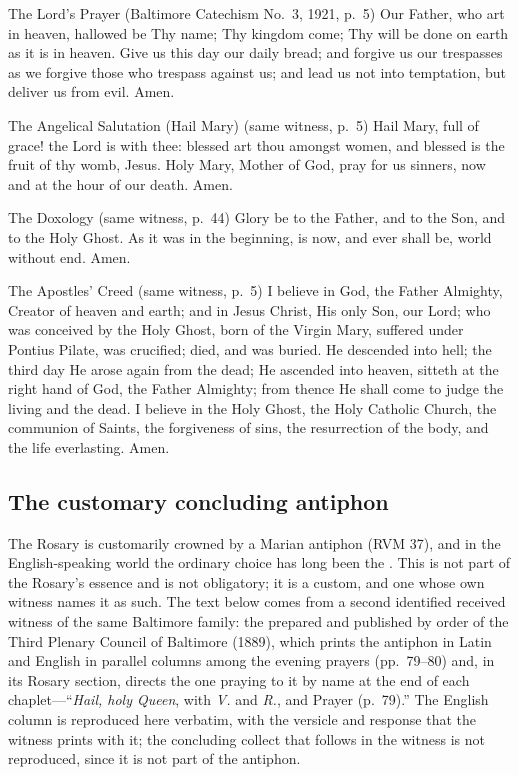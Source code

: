 \begin{receivedtext}{The Lord's Prayer (Baltimore Catechism No.~3, 1921, p.~5)}
Our Father, who art in heaven, hallowed be Thy name; Thy kingdom come;
Thy will be done on earth as it is in heaven. Give us this day our
daily bread; and forgive us our trespasses as we forgive those who
trespass against us; and lead us not into temptation, but deliver us
from evil. Amen.
\end{receivedtext}

\begin{receivedtext}{The Angelical Salutation (Hail Mary) (same witness, p.~5)}
Hail Mary, full of grace! the Lord is with thee: blessed art thou
amongst women, and blessed is the fruit of thy womb, Jesus. Holy Mary,
Mother of God, pray for us sinners, now and at the hour of our death.
Amen.
\end{receivedtext}

\begin{receivedtext}{The Doxology (same witness, p.~44)}
Glory be to the Father, and to the Son, and to the Holy Ghost. As it
was in the beginning, is now, and ever shall be, world without end.
Amen.
\end{receivedtext}

\begin{receivedtext}{The Apostles' Creed (same witness, p.~5)}
I believe in God, the Father Almighty, Creator of heaven and earth; and
in Jesus Christ, His only Son, our Lord; who was conceived by the Holy
Ghost, born of the Virgin Mary, suffered under Pontius Pilate, was
crucified; died, and was buried. He descended into hell; the third day
He arose again from the dead; He ascended into heaven, sitteth at the
right hand of God, the Father Almighty; from thence He shall come to
judge the living and the dead. I believe in the Holy Ghost, the Holy
Catholic Church, the communion of Saints, the forgiveness of sins, the
resurrection of the body, and the life everlasting. Amen.
\end{receivedtext}

\subsection{The customary concluding antiphon}

The Rosary is customarily crowned by a Marian antiphon (RVM 37), and in
the English-speaking world the ordinary choice has long been the
. This is not part of the Rosary's essence and is not
obligatory; it is a custom, and one whose own witness names it as such.
The text below comes from a second identified received witness of the
same Baltimore family: the  prepared and
published by order of the Third Plenary Council of Baltimore (1889),
which prints the antiphon in Latin and English in parallel columns among
the evening prayers (pp.~79--80) and, in its Rosary section, directs the
one praying to it by name at the end of each chaplet---``\emph{Hail, holy
Queen}, with \emph{V.} and \emph{R.}, and Prayer (p.~79).'' The English
column is reproduced here verbatim, with the versicle and response that
the witness prints with it; the concluding collect that follows in the
witness is not reproduced, since it is not part of the antiphon.

